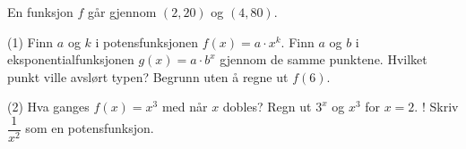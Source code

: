 En funksjon $f$ går gjennom $(2, 20)$ og $(4, 80)$.
\begin{tasks}(1)
  \task Finn $a$ og $k$ i potensfunksjonen $f(x) = a \cdot x^k$.
  \task Finn $a$ og $b$ i eksponentialfunksjonen $g(x) = a \cdot b^x$ gjennom de samme punktene.
  \task Hvilket punkt ville avslørt typen? Begrunn uten å regne ut $f(6)$.
\end{tasks}

\begin{sjekk}
\begin{tasks}(2)
  \task Hva ganges $f(x) = x^3$ med når $x$ dobles?
  \task Regn ut $3^x$ og $x^3$ for $x = 2$.
  \task! Skriv $\dfrac{1}{x^2}$ som en potensfunksjon.
\end{tasks}
\end{sjekk}
